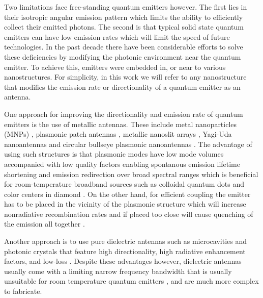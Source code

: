 \documentclass[10pt,onecolumn ]{article}
\begin{document}
Two limitations face free-standing quantum emitters however. The first lies in their isotropic angular emission pattern which limits the ability to efficiently collect their emitted photons. 
The second is that typical solid state quantum emitters can have low emission rates which will limit the speed of future technologies. 
In the past decade there have been considerable efforts to solve these deficiencies by modifying the photonic environment near the quantum emitter. \cite{Dey2016PlasmonicDots,Pelton2015ModifiedStructures}
To achieve this, emitters were embedded in, or near to various nanostructures.  For simplicity, in this work we will refer to any nanostructure that modifies the emission rate or directionality of a quantum emitter as an antenna.

One approach for improving the directionality and emission rate of quantum emitters is the use of metallic antennas.  These include metal nanoparticles (MNPs) \cite{Dey2016PlasmonicDots}, plasmonic patch antennas \cite{Esteban2010OpticalResonances,Belacel2013ControllingAntennas,Bigourdan2014DesignEmission}, metallic nanoslit arrays \cite{Livneh2011}, Yagi-Uda nanoantennas \cite{Curto2010UnidirectionalNanoantenna,Dregely20113DArray} and circular bullseye plasmonic nanoantennas \cite{Li2013ActiveBeams,Harats2014}. 
The advantage of using  such structures is that plasmonic modes have low mode volumes accompanied with low quality factors enabling spontanous emission 
lifetime shortening and emission redirection over broad spectral ranges which is beneficial for room-temperature broadband sources such as colloidal quantum dots and color centers in diamond \cite{Giannini2011PlasmonicNanoemitters}. 
On the other hand, for efficient coupling the emitter has to be placed in the vicinity of the plasmonic structure which will increase nonradiative recombination rates and if placed too close will cause quenching of the emission all together \cite{Dey2016PlasmonicDots} .

Another approach is to use pure dielectric antennas such as microcavities \cite{Ding2016} and photonic crystals \cite{Englund2009QuantumOptics,Laucht2012BroadbandWaveguides,MangaRao2007SingleWaveguide} that feature high directionality, high radiative enhancement factors, and low-loss \cite{Ates2009,Davanco2011AEmission}. 
Despite these advantages however, dielectric antennas usually come with a limiting narrow frequency bandwidth that is usually unsuitable for room temperature quantum emitters \cite{Krasnok2016DemonstrationStructures}, and are much more complex to fabricate.
\end{document}
